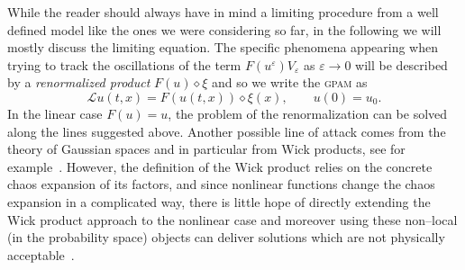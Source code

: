 \documentclass[a4paper,11pt]{article}
\newcommand{\tmem}[1]{{\em #1\/}}
\newcommand{\tmname}[1]{\textsc{#1}}
\newcommand{\LL}{\mathscr{L}}
\newcommand{\renorm}{\,\mathord{\diamond}\,}
\begin{document}
While the reader should always have in mind a limiting procedure from a well
defined model like the ones we were considering so far, in the following we
will mostly discuss the limiting equation. The specific phenomena appearing
when trying to track the oscillations of the term $F (u^{\varepsilon})
V_{\varepsilon}$ as $\varepsilon \rightarrow 0$ will be described by a
{\tmem{renormalized product}} $F (u) \renorm \xi$ and so we write the
{\tmname{gpam}} as
\begin{equation}
  \label{eq:pam-intro} \LL u (t, x) = F (u (t, x)) \renorm \xi (x),
  \hspace{2em} u (0) = u_0 .
\end{equation}
In the linear case $F (u) = u$, the problem of the renormalization can be
solved along the lines suggested above. Another possible line of attack comes
from the theory of Gaussian spaces and in particular from Wick products, see
for example~{\cite{Hu2002}}. However, the definition of the Wick product
relies on the concrete chaos expansion of its factors, and since nonlinear
functions change the chaos expansion in a complicated way, there is little
hope of directly extending the Wick product approach to the nonlinear case and
moreover using these non--local (in the probability space) objects can deliver
solutions which are not physically acceptable~{\cite{Chan2000}}.
\end{document}
